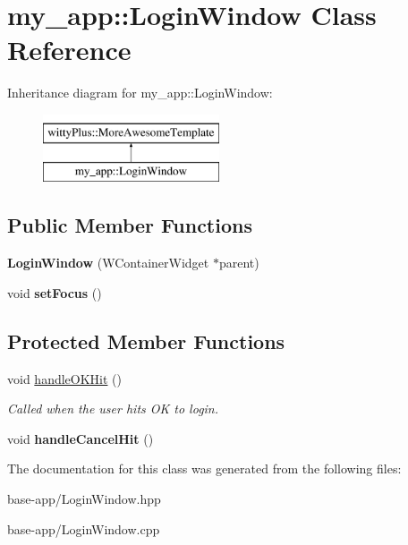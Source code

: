 \hypertarget{classmy__app_1_1LoginWindow}{
\section{my\_\-app::LoginWindow Class Reference}
\label{classmy__app_1_1LoginWindow}
}
Inheritance diagram for my\_\-app::LoginWindow:\begin{figure}[H]
\begin{center}
\leavevmode
\includegraphics[height=2.000000cm]{classmy__app_1_1LoginWindow}
\end{center}
\end{figure}
\subsection*{Public Member Functions}
\begin{DoxyCompactItemize}
\item 
\hypertarget{classmy__app_1_1LoginWindow_ae0d9633b91854eacef2dd9f619fc1855}{
{\bfseries LoginWindow} (WContainerWidget $\ast$parent)}
\label{classmy__app_1_1LoginWindow_ae0d9633b91854eacef2dd9f619fc1855}

\item 
\hypertarget{classmy__app_1_1LoginWindow_ab96cd8b6c8f1058478b102f827ad3df9}{
void {\bfseries setFocus} ()}
\label{classmy__app_1_1LoginWindow_ab96cd8b6c8f1058478b102f827ad3df9}

\end{DoxyCompactItemize}
\subsection*{Protected Member Functions}
\begin{DoxyCompactItemize}
\item 
\hypertarget{classmy__app_1_1LoginWindow_a36236301e1fe631d8b326173216c2863}{
void \hyperlink{classmy__app_1_1LoginWindow_a36236301e1fe631d8b326173216c2863}{handleOKHit} ()}
\label{classmy__app_1_1LoginWindow_a36236301e1fe631d8b326173216c2863}

\begin{DoxyCompactList}\small\item\em Called when the user hits OK to login. \item\end{DoxyCompactList}\item 
\hypertarget{classmy__app_1_1LoginWindow_ab196797d2d2653720294f1b5b59a269a}{
void {\bfseries handleCancelHit} ()}
\label{classmy__app_1_1LoginWindow_ab196797d2d2653720294f1b5b59a269a}

\end{DoxyCompactItemize}


The documentation for this class was generated from the following files:\begin{DoxyCompactItemize}
\item 
base-\/app/LoginWindow.hpp\item 
base-\/app/LoginWindow.cpp\end{DoxyCompactItemize}
